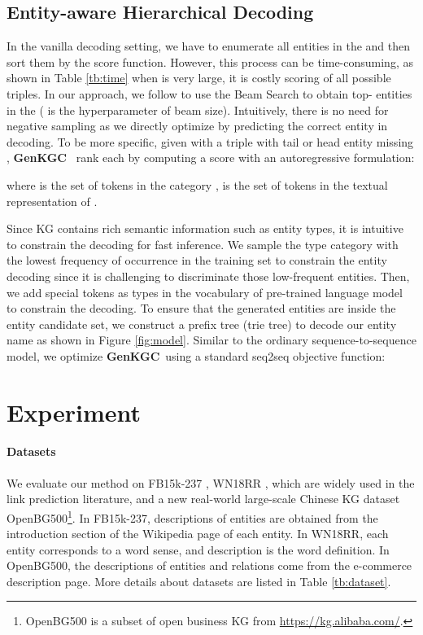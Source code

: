 \documentclass[sigconf]{acmart}
\newcommand{\ours}{\textbf{GenKGC}}
\begin{document}
\subsection{Entity-aware Hierarchical Decoding}



In the vanilla decoding setting, we have to enumerate all entities in the  and then sort them by the score function.
However, this process can be time-consuming, as shown in  Table \ref{tb:time} when  is very large, it is costly scoring of all possible triples.
In our approach, we follow  \cite{DBLP:conf/iclr/CaoI0P21} to use the Beam Search to obtain top- entities in the  ( is the hyperparameter of beam size).
Intuitively, there is no need for negative sampling as we directly optimize by predicting the correct entity in decoding.
To be more specific, given with a triple with tail or head entity missing , \ours~  rank each  by computing a score with an autoregressive formulation:


where  is the set of  tokens in the category ,  is the set of  tokens in the textual representation of . 



Since KG contains rich semantic information such as entity types, it is intuitive to constrain the decoding for fast inference.
We sample the type category with the lowest frequency of occurrence in the training set to constrain the entity decoding since it is challenging to discriminate those low-frequent entities.
Then, we add special tokens as types in the  vocabulary of pre-trained language model to constrain the decoding. 
To ensure that the generated entities are inside the entity candidate set, we construct a prefix tree (trie tree) to decode our entity name as shown in Figure \ref{fig:model}.
Similar to the ordinary sequence-to-sequence model, we optimize \ours~using a standard seq2seq objective function:




\section{Experiment}



\paragraph{Datasets}
We evaluate our method on FB15k-237 \cite{fb15k}, WN18RR \cite{wn18rr}, which are widely used in the link prediction literature, and a new real-world large-scale Chinese KG dataset OpenBG500\footnote{OpenBG500 is a subset of open business KG from \url{https://kg.alibaba.com/}.}.
In FB15k-237, descriptions of entities are obtained from the introduction section of the Wikipedia page of each entity. 
In WN18RR, each entity corresponds to a word sense, and description is the word definition. 
In OpenBG500, the descriptions of entities and relations come from the e-commerce description page.
More details about datasets are listed in Table \ref{tb:dataset}.
\end{document}
